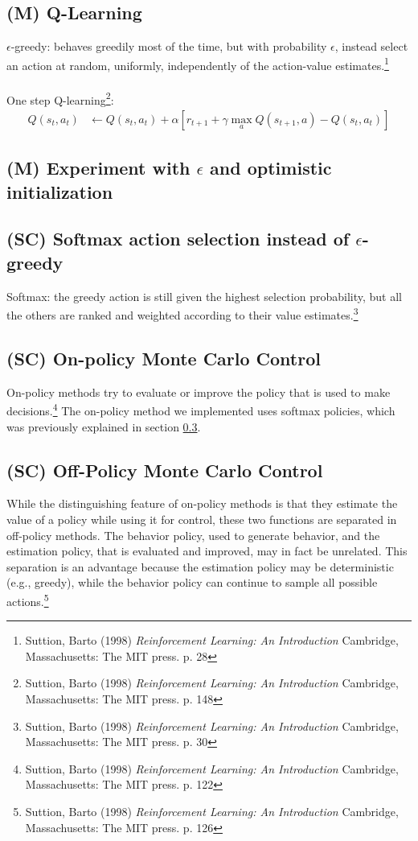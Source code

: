 \documentclass{article}
\begin{document}
\subsection{(M) Q-Learning}
$\epsilon$-greedy: behaves greedily most of the time, but with probability $\epsilon$, instead select an action at random, uniformly, independently of the action-value estimates.\footnote{Suttion, Barto (1998) \textit{Reinforcement Learning: An Introduction} Cambridge, Massachusetts: The MIT press. p. 28}\\ \\
One step Q-learning\footnote{Suttion, Barto (1998) \textit{Reinforcement Learning: An Introduction} Cambridge, Massachusetts: The MIT press. p. 148}:
\\
\begin{align*}
Q(s_t,a_t) & \leftarrow Q(s_t,a_t) + \alpha \left[ r_{t+1} + \gamma \displaystyle\max_a Q(s_{t+1},a) - Q(s_t,a_t) \right]
\end{align*}

\subsection{(M) Experiment with $\epsilon$ and optimistic initialization}
\subsection{(SC) Softmax action selection instead of $\epsilon$-greedy}\label{sec:softmax}
Softmax: the greedy action is still given the highest selection probability, but all the others are ranked and weighted according to their value estimates.\footnote{Suttion, Barto (1998) \textit{Reinforcement Learning: An Introduction} Cambridge, Massachusetts: The MIT press. p. 30}
\subsection{(SC) On-policy Monte Carlo Control}
On-policy methods try to evaluate or improve the policy that is used to make decisions.\footnote{Suttion, Barto (1998) \textit{Reinforcement Learning: An Introduction} Cambridge, Massachusetts: The MIT press. p. 122} The on-policy method we implemented uses softmax policies, which was previously explained in section \ref{sec:softmax}.
\subsection{(SC) Off-Policy Monte Carlo Control}
While the distinguishing feature of on-policy methods is that they estimate the value of a policy while using it for control, these two functions are separated in off-policy methods. The behavior policy, used to generate behavior, and the estimation policy, that is evaluated and improved, may in fact be unrelated. This separation is an advantage because the estimation policy may be deterministic (e.g., greedy), while the behavior policy can continue to sample all possible actions.\footnote{Suttion, Barto (1998) \textit{Reinforcement Learning: An Introduction} Cambridge, Massachusetts: The MIT press. p. 126}
\end{document}
